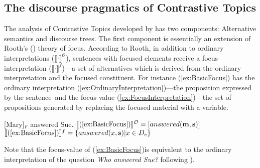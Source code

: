\documentclass[
]{RCL}
\begin{document}
\subsection{The discourse pragmatics of Contrastive Topics \citep{buring2003d,buring2016topic}}\label{sec:BuringCT}
The analysis of Contrastive Topics developed by \citet{buring2003d} has two components: Alternative semantics and discourse trees.
The first component is essentially an extension of Rooth's (\citeyear{rooth1992theory}) theory of focus.
According to Rooth, in addition to ordinary interpretations ($\llbracket\cdot\rrbracket^\mathcal{O}$), sentences with focused elements receive a focus interpretation ($\llbracket\cdot\rrbracket^f$)---a set of alternatives which is derived from the ordinary interpretation and the focused constituent.
For instance (\ref{ex:BasicFocus}) has the ordinary interpretation (\ref{ex:OrdinaryInterpretation})---the proposition expressed by the sentence--and the focus-value (\ref{ex:FocusInterpretation})---the set of propositions generated by replacing the focused material with a variable.
\begin{exe}
	\ex\label{ex:BasicFocus}{[Mary]$_F$ answered Sue.}
	\ex\label{ex:OrdinaryInterpretation} $\llbracket(\ref{ex:BasicFocus})\rrbracket^\mathcal{O} = [answered(\mathbf{m}, \mathbf{s})]$
	\ex\label{ex:FocusInterpretation} $\llbracket(\ref{ex:BasicFocus})\rrbracket^f = \left\{ answered(x, \mathbf{s}) | x \in D_e \right\}$
\end{exe}
Note that the focus-value of (\ref{ex:BasicFocus})is equivalent to the ordinary interpretation of the question \textit{Who answered Sue?} following \citet{hamblin1973questions}).
\end{document}
